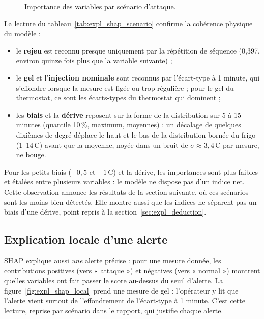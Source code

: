 \begin{figure}[H]
\centering
{}
\caption{Importance des variables par scénario d'attaque.}
\label{fig:expl_shap_scenario}
\end{figure}

La lecture du tableau~\ref{tab:expl_shap_scenario} confirme la cohérence
physique du modèle :

\begin{itemize}
  \item le \textbf{rejeu} est reconnu presque uniquement par la répétition de
        séquence (0,397, environ quinze fois plus que la variable suivante) ;
  \item le \textbf{gel} et l'\textbf{injection nominale} sont reconnus par
        l'écart-type à 1 minute, qui s'effondre lorsque la mesure est figée
        ou trop régulière ; pour le gel du thermostat, ce sont les
        écarts-types du thermostat qui dominent ;
  \item les \textbf{biais} et la \textbf{dérive} reposent sur la forme de la
        distribution sur 5 à 15 minutes (quantile 10\,\%, maximum, moyennes) :
        un décalage de quelques dixièmes de degré déplace le haut et le bas
        de la distribution bornée du frigo (1--14\,\textdegree C) avant que
        la moyenne, noyée dans un bruit de $\sigma \approx
        3{,}4$\,\textdegree C par mesure, ne bouge.
\end{itemize}

Pour les petits biais ($-0{,}5$ et $-1$\,\textdegree C) et la dérive, les
importances sont plus faibles et étalées entre plusieurs variables : le
modèle ne dispose pas d'un indice net. Cette observation annonce les
résultats de la section suivante, où ces scénarios sont les moins bien
détectés. Elle montre aussi que les indices ne séparent pas un biais d'une
dérive, point repris à la section~\ref{sec:expl_deduction}.

\subsection{Explication locale d'une alerte}

SHAP explique aussi \emph{une} alerte précise : pour une mesure donnée, les
contributions positives (vers « attaque ») et négatives (vers « normal »)
montrent quelles variables ont fait passer le score au-dessus du seuil
d'alerte. La figure~\ref{fig:expl_shap_local} prend une mesure de gel :
l'opérateur y lit que l'alerte vient surtout de l'effondrement de l'écart-type
à 1 minute. C'est cette lecture, reprise par scénario dans le rapport, qui
justifie chaque alerte.


